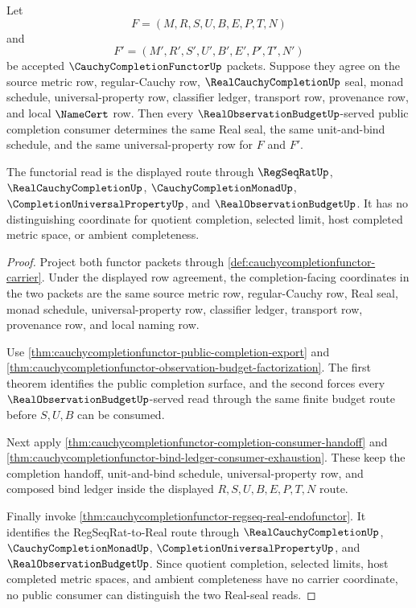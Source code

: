 \begin{theorem}
\label{thm:cauchycompletionfunctor-real-seal-functoriality}
Let
$$
F=(M,R,S,U,B,E,P,T,N)
$$
and
$$
F'=(M',R',S',U',B',E',P',T',N')
$$
be accepted $\CauchyCompletionFunctorUp$ packets. Suppose they agree on the source metric row, regular-Cauchy row, $\RealCauchyCompletionUp$ seal, monad schedule, universal-property row, classifier ledger, transport row, provenance row, and local $\NameCert$ row. Then every $\RealObservationBudgetUp$-served public completion consumer determines the same Real seal, the same unit-and-bind schedule, and the same universal-property row for $F$ and $F'$.

The functorial read is the displayed route through $\RegSeqRatUp$, $\RealCauchyCompletionUp$, $\CauchyCompletionMonadUp$, $\CompletionUniversalPropertyUp$, and $\RealObservationBudgetUp$. It has no distinguishing coordinate for quotient completion, selected limit, host completed metric space, or ambient completeness.
\end{theorem}
\begin{proof}
Project both functor packets through \autoref{def:cauchycompletionfunctor-carrier}. Under the displayed row agreement, the completion-facing coordinates in the two packets are the same source metric row, regular-Cauchy row, Real seal, monad schedule, universal-property row, classifier ledger, transport row, provenance row, and local naming row.

Use \autoref{thm:cauchycompletionfunctor-public-completion-export} and \autoref{thm:cauchycompletionfunctor-observation-budget-factorization}. The first theorem identifies the public completion surface, and the second forces every $\RealObservationBudgetUp$-served read through the same finite budget route before $S,U,B$ can be consumed.

Next apply \autoref{thm:cauchycompletionfunctor-completion-consumer-handoff} and \autoref{thm:cauchycompletionfunctor-bind-ledger-consumer-exhaustion}. These keep the completion handoff, unit-and-bind schedule, universal-property row, and composed bind ledger inside the displayed $R,S,U,B,E,P,T,N$ route.

Finally invoke \autoref{thm:cauchycompletionfunctor-regseq-real-endofunctor}. It identifies the RegSeqRat-to-Real route through $\RealCauchyCompletionUp$, $\CauchyCompletionMonadUp$, $\CompletionUniversalPropertyUp$, and $\RealObservationBudgetUp$. Since quotient completion, selected limits, host completed metric spaces, and ambient completeness have no carrier coordinate, no public consumer can distinguish the two Real-seal reads.
\end{proof}

